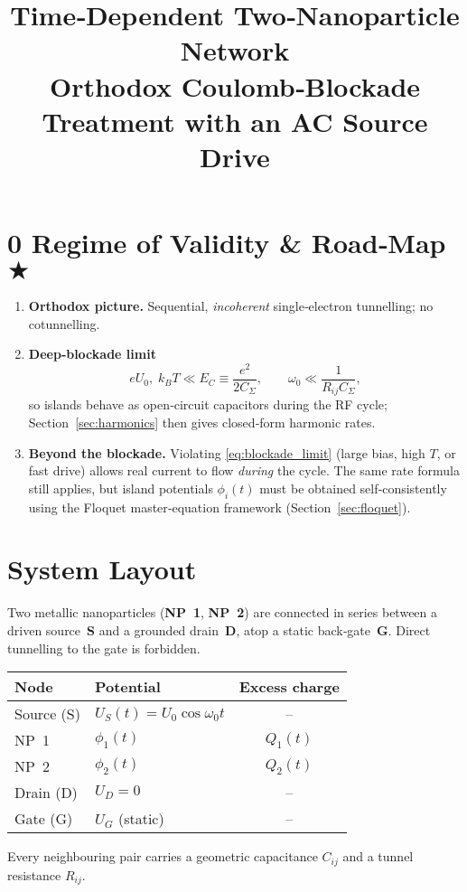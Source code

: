\documentclass[11pt]{article}
\begin{document}
\title{Time‑Dependent Two‑Nanoparticle Network\\ \large Orthodox Coulomb‑Blockade Treatment with an AC Source Drive}
\author{}
\date{}
\maketitle

\section*{0\; Regime of Validity \& Road‑Map $\bigstar$}
\label{sec:validity}

\begin{enumerate}
    \item \textbf{Orthodox picture.} Sequential, \emph{incoherent} single‑electron tunnelling; no cotunnelling.
    \item \textbf{Deep‑blockade limit}
    \begin{equation}
        eU_0,\;k_B T \ll E_C \equiv \frac{e^2}{2C_\Sigma}, \qquad
        \omega_0 \ll \frac{1}{R_{ij}C_\Sigma},
        \label{eq:blockade_limit}
    \end{equation}
    so islands behave as open‑circuit capacitors during the RF cycle; Section~\ref{sec:harmonics} then gives closed‑form harmonic rates.
    \item \textbf{Beyond the blockade.} Violating \eqref{eq:blockade_limit} (large bias, high $T$, or fast drive) allows real current to flow \emph{during} the cycle.  The same rate formula still applies, but island potentials $\phi_i(t)$ must be obtained self‑consistently using the Floquet master‑equation framework (Section~\ref{sec:floquet}).
\end{enumerate}

\section{System Layout}
Two metallic nanoparticles (\textbf{NP 1}, \textbf{NP 2}) are connected in series between a driven source~\textbf{S} and a grounded drain~\textbf{D}, atop a static back‑gate~\textbf{G}. Direct tunnelling to the gate is forbidden.

\begin{center}
\begin{tabular}{@{}llc@{}}
\toprule
\textbf{Node} & \textbf{Potential} & \textbf{Excess charge} \\
\midrule
Source (S) & $U_S(t)=U_0\cos\omega_0 t$ & – \\
NP 1 & $\phi_1(t)$ & $Q_1(t)$ \\
NP 2 & $\phi_2(t)$ & $Q_2(t)$ \\
Drain (D) & $U_D=0$ & – \\
Gate (G)  & $U_G$ (static) & – \\
\bottomrule
\end{tabular}
\end{center}
Every neighbouring pair carries a geometric capacitance $C_{ij}$ and a tunnel resistance $R_{ij}$.
\end{document}
